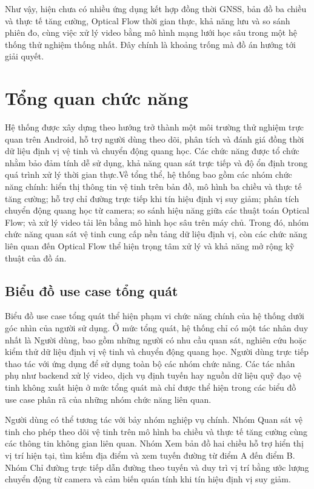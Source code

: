 \documentclass[../DoAn.tex]{subfiles}
\begin{document}
Như vậy, hiện chưa có nhiều ứng dụng kết hợp đồng thời GNSS, bản đồ ba chiều và thực tế tăng cường, Optical Flow thời gian thực, khả năng lưu và so sánh phiên đo, cùng việc xử lý video bằng mô hình mạng lưới học sâu trong một hệ thống thử nghiệm thống nhất. Đây chính là khoảng trống mà đồ án hướng tới giải quyết.

\section{Tổng quan chức năng}
\label{section:2.2}
Hệ thống được xây dựng theo hướng trở thành một môi trường thử nghiệm trực quan trên Android, hỗ trợ người dùng theo dõi, phân tích và đánh giá đồng thời dữ liệu định vị vệ tinh và chuyển động quang học. Các chức năng được tổ chức nhằm bảo đảm tính dễ sử dụng, khả năng quan sát trực tiếp và độ ổn định trong quá trình xử lý thời gian thực.Về tổng thể, hệ thống bao gồm các nhóm chức năng chính: hiển thị thông tin vệ tinh trên bản đồ, mô hình ba chiều và thực tế tăng cường; hỗ trợ chỉ đường trực tiếp khi tín hiệu định vị suy giảm; phân tích chuyển động quang học từ camera; so sánh hiệu năng giữa các thuật toán Optical Flow; và xử lý video tải lên bằng mô hình học sâu trên máy chủ. Trong đó, nhóm chức năng quan sát vệ tinh cung cấp nền tảng dữ liệu định vị, còn các chức năng liên quan đến Optical Flow thể hiện trọng tâm xử lý và khả năng mở rộng kỹ thuật của đồ án.

\subsection{Biểu đồ use case tổng quát}
\label{subsection:2.2.1}
Biểu đồ use case tổng quát thể hiện phạm vi chức năng chính của hệ thống dưới góc nhìn của người sử dụng. Ở mức tổng quát, hệ thống chỉ có một tác nhân duy nhất là Người dùng, bao gồm những người có nhu cầu quan sát, nghiên cứu hoặc kiểm thử dữ liệu định vị vệ tinh và chuyển động quang học. Người dùng trực tiếp thao tác với ứng dụng để sử dụng toàn bộ các nhóm chức năng. Các tác nhân phụ như backend xử lý video, dịch vụ định tuyến hay nguồn dữ liệu quỹ đạo vệ tinh không xuất hiện ở mức tổng quát mà chỉ được thể hiện trong các biểu đồ use case phân rã của những nhóm chức năng liên quan.

Người dùng có thể tương tác với bảy nhóm nghiệp vụ chính. Nhóm Quan sát vệ tinh cho phép theo dõi vệ tinh trên mô hình ba chiều và thực tế tăng cường cùng các thông tin không gian liên quan. Nhóm Xem bản đồ hai chiều hỗ trợ hiển thị vị trí hiện tại, tìm kiếm địa điểm và xem tuyến đường từ điểm A đến điểm B. Nhóm Chỉ đường trực tiếp dẫn đường theo tuyến và duy trì vị trí bằng ước lượng chuyển động từ camera và cảm biến quán tính khi tín hiệu định vị suy giảm.
\end{document}
